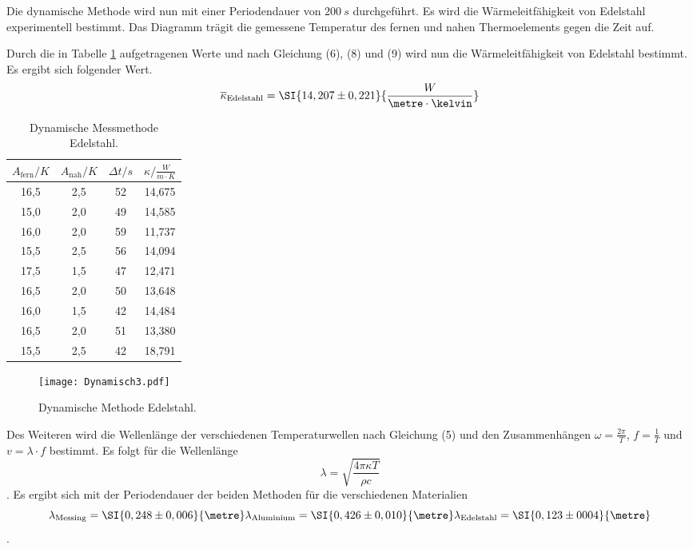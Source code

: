 Die dynamische Methode wird nun mit einer Periodendauer von $\SI{200}{s}$ durchgeführt.
Es wird die Wärmeleitfähigkeit von Edelstahl experimentell bestimmt.
Das Diagramm trägit die gemessene Temperatur des fernen und nahen Thermoelements gegen die Zeit auf.
 
Durch die in Tabelle \ref{tab:e} aufgetragenen Werte und nach Gleichung (6), (8) und (9) wird nun die Wärmeleitfähigkeit von Edelstahl bestimmt.
Es ergibt sich folgender Wert.
\begin{equation}
    \overline{\kappa}_\text{Edelstahl} =  \SI{14,207 \pm 0,221}{\frac{W}{\metre\cdot \kelvin}} \notag
\end{equation}

\begin{table}[H]
    \begin{center}
      \caption{Dynamische Messmethode Edelstahl.}
      \label{tab:e}
      \begin{tabular}{c|c|c|c} 
        \textbf{$A_\text{fern} / K$ } &  \textbf{$A_\text{nah} / K$} & \textbf{$\Delta t / s$} & \textbf{$\kappa / \frac{W}{m \cdot K}$}\\
        \hline
        16,5 &2,5 &52 & 14,675 \\
        15,0 &2,0 &49 & 14,585 \\
        16,0 &2,0 &59 & 11,737 \\
        15,5 &2,5 &56 & 14,094 \\
        17,5 &1,5 &47 & 12,471 \\
        16,5 &2,0 &50 & 13,648 \\
        16,0 &1,5 &42 & 14,484 \\
        16,5 &2,0 &51 & 13,380 \\
        15,5 &2,5 &42 & 18,791 \\
      \end{tabular}
    \end{center}
\end{table}

\begin{figure}[H]
    \centering
    \texttt{[image: Dynamisch3.pdf]}
    \caption{Dynamische Methode Edelstahl.}
    \label{fig:e}
\end{figure}

Des Weiteren wird die Wellenlänge der verschiedenen Temperaturwellen nach Gleichung (5) und den Zusammenhängen $\omega = \frac{2 \pi}{T}$, $f =\frac{1}{T}$ und $v = \lambda \cdot f$ bestimmt.
Es folgt für die Wellenlänge
\begin{equation}
    \lambda = \sqrt{\frac{4 \pi \kappa T}{\rho c}}
\end{equation}.
Es ergibt sich mit der Periodendauer der beiden Methoden für die verschiedenen Materialien
\begin{equation*}
    \lambda_\text{Messing} = \SI{0,248 \pm 0,006}{\metre}
    \lambda_\text{Aluminium} = \SI{0,426 \pm 0,010}{\metre}
    \lambda_\text{Edelstahl} = \SI{0,123 \pm 0004}{\metre}
\end{equation*}.
